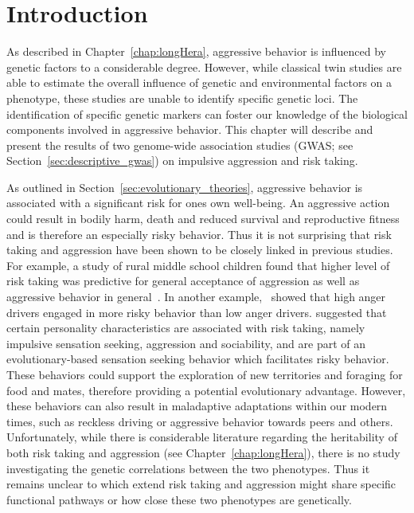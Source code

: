 \section{Introduction}
\label{sec:introduction_assoc}

As described in Chapter~\ref{chap:longHera}, aggressive behavior is influenced by genetic factors to a considerable degree.
However, while classical twin studies are able to estimate the overall influence of genetic and environmental factors on a phenotype, these studies are unable to identify specific genetic loci.
The identification of specific genetic markers can foster our knowledge of the biological components involved in aggressive behavior. 
This chapter will describe and present the results of two genome-wide association studies (GWAS; see Section~\ref{sec:descriptive_gwas}) on impulsive aggression and risk taking.

As outlined in Section~\ref{sec:evolutionary_theories}, aggressive behavior is associated with a significant risk for ones own well-being.
An aggressive action could result in bodily harm, death and reduced survival and reproductive fitness and is therefore an especially risky behavior.
Thus it is not surprising that risk taking and aggression have been shown to be closely linked in previous studies.
For example, a study of rural middle school children found that higher level of risk taking was  predictive for general acceptance of aggression as well as aggressive behavior in general~\cite{Swaim2004}.
In another example,~\citet{Deffenbacher2003} showed that high anger drivers engaged in more risky behavior than low anger drivers.
\citet{Zuckerman2000} suggested that certain personality characteristics are associated with risk taking, namely impulsive sensation seeking, aggression and sociability, and are part of an evolutionary-based sensation seeking behavior which facilitates risky behavior.
These behaviors could support the exploration of new territories and foraging for food and mates,
therefore providing a potential evolutionary advantage.
However, these behaviors can also result in maladaptive adaptations within our modern times, such as reckless driving or aggressive behavior towards peers and others.
Unfortunately, while there is considerable literature regarding the heritability of both risk taking and aggression (see Chapter~\ref{chap:longHera}), there is no study investigating the genetic correlations between the two phenotypes.
Thus it remains unclear to which extend risk taking and aggression might share specific functional pathways or how close these two phenotypes are genetically.

